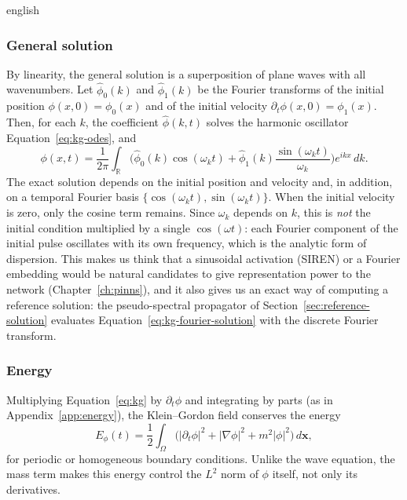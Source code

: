 \documentclass[11pt,letterpaper,twoside,openright]{book} %
\newcommand{\abs}[1]{\left\lvert #1 \right\rvert}
\begin{document}
\begin{hyphenrules}{english}
\subsubsection{General solution}
By linearity, the general solution is a superposition of plane waves with all wavenumbers. Let
$\hat\phi_0(k)$ and $\hat\phi_1(k)$ be the Fourier transforms of the initial position
$\phi(x,0)=\phi_0(x)$ and of the initial velocity $\partial_t\phi(x,0)=\phi_1(x)$. Then, for each $k$,
the coefficient $\hat\phi(k,t)$ solves the harmonic oscillator Equation~\eqref{eq:kg-odes}, and
\begin{equation}
  \phi(x,t)=\frac{1}{2\pi}\int_{\mathbb{R}}\Big(\hat\phi_0(k)\cos(\omega_kt)
  +\hat\phi_1(k)\frac{\sin(\omega_kt)}{\omega_k}\Big)e^{ikx}\,d k.
  \label{eq:kg-fourier-solution}
\end{equation}
The exact solution depends on the initial position and velocity and, in addition, on a temporal
Fourier basis $\{\cos(\omega_kt),\sin(\omega_kt)\}$. When the initial velocity is zero, only the cosine
term remains. Since $\omega_k$ depends on $k$, this is \emph{not} the initial condition multiplied by a
single $\cos(\omega t)$: each Fourier component of the initial pulse oscillates with its own frequency,
which is the analytic form of dispersion. This makes us think that a sinusoidal activation (SIREN) or a
Fourier embedding would be natural candidates to give representation power to the network
(Chapter~\ref{ch:pinns}), and it also gives us an exact way of computing a reference solution: the
pseudo-spectral propagator of Section~\ref{sec:reference-solution} evaluates
Equation~\eqref{eq:kg-fourier-solution} with the discrete Fourier transform.

\subsubsection{Energy}
Multiplying Equation~\eqref{eq:kg} by $\partial_t\phi$ and integrating by parts (as in Appendix~\ref{app:energy}), the
Klein--Gordon field conserves the energy
\begin{equation}
  E_\phi(t)=\frac12\int_\Omega\Big(\abs{\partial_t\phi}^2+\abs{\nabla\phi}^2+m^2\abs{\phi}^2\Big)\,d\mathbf{x},
  \label{eq:kg-energy}
\end{equation}
for periodic or homogeneous boundary conditions. Unlike the wave equation, the mass term makes this
energy control the $L^2$ norm of $\phi$ itself, not only its derivatives.


\end{hyphenrules}
\end{document}
